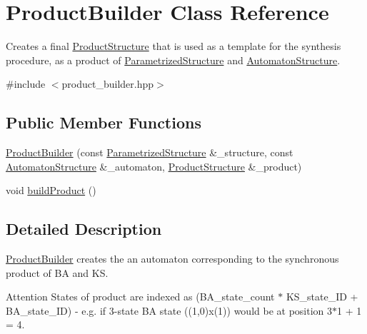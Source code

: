 \hypertarget{classProductBuilder}{\section{\-Product\-Builder \-Class \-Reference}
\label{classProductBuilder}
}


\-Creates a final \hyperlink{classProductStructure}{\-Product\-Structure} that is used as a template for the synthesis procedure, as a product of \hyperlink{classParametrizedStructure}{\-Parametrized\-Structure} and \hyperlink{classAutomatonStructure}{\-Automaton\-Structure}.  




{\ttfamily \#include $<$product\-\_\-builder.\-hpp$>$}

\subsection*{\-Public \-Member \-Functions}
\begin{DoxyCompactItemize}
\item 
\hyperlink{classProductBuilder_a43533c506209311b76fa7cd8c216ea5f}{\-Product\-Builder} (const \hyperlink{classParametrizedStructure}{\-Parametrized\-Structure} \&\-\_\-structure, const \hyperlink{classAutomatonStructure}{\-Automaton\-Structure} \&\-\_\-automaton, \hyperlink{classProductStructure}{\-Product\-Structure} \&\-\_\-product)
\item 
void \hyperlink{classProductBuilder_a1eaedceb9c2d2bff07090abfa82d83dd}{build\-Product} ()
\end{DoxyCompactItemize}


\subsection{\-Detailed \-Description}
\hyperlink{classProductBuilder}{\-Product\-Builder} creates the an automaton corresponding to the synchronous product of \-B\-A and \-K\-S. \begin{DoxyAttention}{\-Attention}
\-States of product are indexed as (\-B\-A\-\_\-state\-\_\-count $\ast$ \-K\-S\-\_\-state\-\_\-\-I\-D + \-B\-A\-\_\-state\-\_\-\-I\-D) -\/ e.\-g. if 3-\/state \-B\-A state ((1,0)x(1)) would be at position 3$\ast$1 + 1 = 4. 
\end{DoxyAttention}


